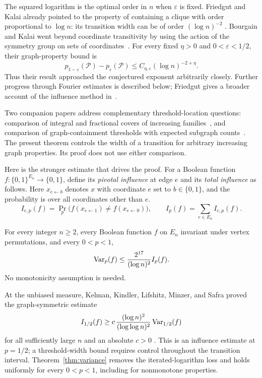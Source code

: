 The squared logarithm is the optimal order in $n$ when
$\varepsilon$ is fixed. Friedgut and Kalai already pointed to the
property of containing a clique with order proportional to $\log n$:
its transition width can be of order $(\log n)^{-2}$
\cite[p.~2994]{FK96}.
Bourgain and Kalai went beyond coordinate transitivity by using the
action of the symmetry group on sets of coordinates~\cite{BK97}.
For every fixed $\eta>0$ and $0<\varepsilon<1/2$, their graph-property
bound is
\[
 p_{1-\varepsilon}(\mathcal P)-p_\varepsilon(\mathcal P)
 \le C_{\eta,\varepsilon}(\log n)^{-2+\eta}.
\]
Thus their result approached the conjectured exponent arbitrarily
closely. Further progress through Fourier estimates is described below;
Friedgut gives a broader account of the influence method
in~\cite{Friedgut22}.

Two companion papers address complementary threshold-location
questions: comparison of integral and fractional covers of increasing
families~\cite[Theorem~1.1]{ExpectationEquivalence2026}, and comparison
of graph-containment thresholds with expected subgraph
counts~\cite[Theorem~1.1]{SecondKahnKalai2026}.
The present theorem controls the width of a transition for arbitrary
increasing graph properties. Its proof does not use either comparison.

Here is the stronger estimate that drives the proof. For a Boolean function $f:\{0,1\}^{E_n}\to\{0,1\}$, define its \emph{pivotal influence} at edge $e$ and its \emph{total influence} as follows. Here $x_{e\leftarrow b}$ denotes $x$ with coordinate $e$ set to $b\in\{0,1\}$, and the probability is over all coordinates other than $e$.
\[
 I_{e,p}(f)=\Pr_p\bigl(f(x_{e\leftarrow1})\ne f(x_{e\leftarrow0})\bigr),
 \qquad I_p(f)=\sum_{e\in E_n}I_{e,p}(f).
\]

\begin{theorem}
\label{thm:variance}
For every integer $n\ge2$, every Boolean function $f$ on $E_n$ invariant under vertex permutations, and every $0<p<1$,
\begin{equation}
\label{eq:variance}
 \operatorname{Var}_p(f)\le\frac{2^{17}}{(\log n)^2}I_p(f).
\end{equation}
No monotonicity assumption is needed.
\end{theorem}

At the unbiased measure, Kelman, Kindler, Lifshitz, Minzer, and Safra
proved the graph-symmetric estimate
\[
 I_{1/2}(f)\ge
 c\,\frac{(\log n)^2}{(\log\log n)^2}\operatorname{Var}_{1/2}(f)
\]
for all sufficiently large $n$ and an absolute $c>0$
\cite[arXiv version~2, Section~7.4]{KKLMS20}.
This is an influence estimate at $p=1/2$; a threshold-width bound
requires control throughout the transition interval.
Theorem~\ref{thm:variance} removes the iterated-logarithm loss and
holds uniformly for every $0<p<1$, including for nonmonotone properties.

